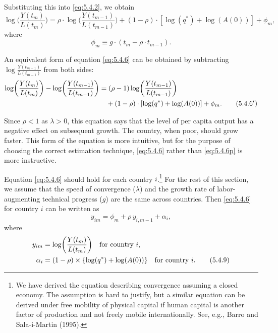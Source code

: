 Substituting this into \eqref{eq:5.4.2}, we obtain
\begin{equation}
  \log\biggl(\frac{Y(t_m)}{L(t_m)}\biggr)
  = \rho \cdot \log\biggl(\frac{Y(t_{m-1})}{L(t_{m-1})}\biggr)
  + (1-\rho) \cdot [\log(q^*) + \log(A(0))] + \phi_m,
  \label{eq:5.4.6} \tag{5.4.6}
\end{equation}
where
\begin{equation}
  \phi_m \equiv g \cdot (t_m - \rho \cdot t_{m-1}).
  \label{eq:5.4.7} \tag{5.4.7}
\end{equation}

An equivalent form of equation \eqref{eq:5.4.6} can be obtained by subtracting
$\log\frac{Y(t_{m-1})}{L(t_{m-1})}$ from both sides:
\begin{align}
  \log\biggl(\frac{Y(t_m)}{L(t_m)}\biggr) - \log\biggl(\frac{Y(t_{m-1})}{L(t_{m-1})}\biggr)
  &= (\rho - 1)\log\biggl(\frac{Y(t_{m-1})}{L(t_{m-1})}\biggr)
  \notag \\
  &\quad + (1-\rho)\cdot[\log(q^*) + \log(A(0))] + \phi_m.
  \label{eq:5.4.6p} \tag{5.4.6$'$}
\end{align}

Since $\rho < 1$ as $\lambda > 0$, this equation says that the level of per capita output has a
negative effect on subsequent growth. The country, when poor, should grow faster.
This form of the equation is more intuitive, but for the purpose of choosing the
correct estimation technique, \eqref{eq:5.4.6} rather than \eqref{eq:5.4.6p} is more instructive.

Equation \eqref{eq:5.4.6} should hold for each country $i$.\footnote{We have derived the equation
describing convergence assuming a closed economy. The assumption is hard
to justify, but a similar equation can be derived under free mobility of physical capital
if human capital is another
factor of production and not freely mobile internationally. See, e.g., Barro and
Sala-i-Martin (1995).}
For the rest of this section, we
assume that the speed of convergence ($\lambda$) and the growth rate of labor-augmenting
technical progress ($g$) are the same across countries. Then \eqref{eq:5.4.6} for country $i$ can
be written as
\begin{equation}
  y_{im} = \phi_m + \rho\, y_{i,m-1} + \alpha_i,
  \label{eq:5.4.8} \tag{5.4.8}
\end{equation}
where
\begin{align}
  y_{im} &= \log\biggl(\frac{Y(t_m)}{L(t_m)}\biggr) \quad \text{for country } i,
  \notag \\
  \alpha_i &= (1-\rho) \times \{\log(q^*) + \log(A(0))\}
  \quad \text{for country } i.
  \label{eq:5.4.9} \tag{5.4.9}
\end{align}

